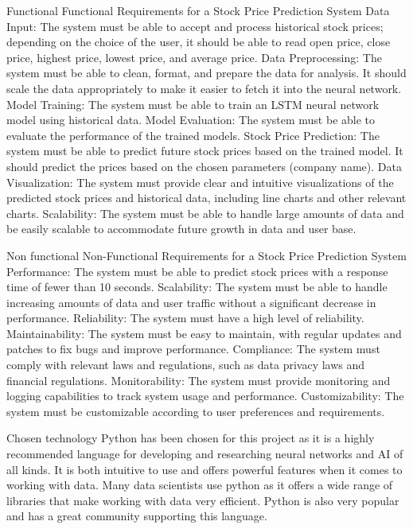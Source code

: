 \documentclass[a4paper,twoside,12pt]{book}
\begin{document}
\begin{itemize}

	Functional
	Functional Requirements for a Stock Price Prediction System
	Data Input: The system must be able to accept and process historical stock prices; depending on the choice of the user, it should be able to read open price, close price, highest price, lowest price, and average price.
	Data Preprocessing: The system must be able to clean, format, and prepare the data for analysis. It should scale the data appropriately to make it easier to fetch it into the neural network.
	Model Training: The system must be able to train an LSTM neural network model using historical data.
	Model Evaluation: The system must be able to evaluate the performance of the trained models.
	Stock Price Prediction: The system must be able to predict future stock prices based on the trained model. It should predict the prices based on the chosen parameters (company name).
	Data Visualization: The system must provide clear and intuitive visualizations of the predicted stock prices and historical data, including line charts and other relevant charts.
	Scalability: The system must be able to handle large amounts of data and be easily scalable to accommodate future growth in data and user base.
	
	
	Non functional
	Non-Functional Requirements for a Stock Price Prediction System
	Performance: The system must be able to predict stock prices with a response time of fewer than 10 seconds.
	Scalability: The system must be able to handle increasing amounts of data and user traffic without a significant decrease in performance.
	Reliability: The system must have a high level of reliability.
	Maintainability: The system must be easy to maintain, with regular updates and patches to fix bugs and improve performance.
	Compliance: The system must comply with relevant laws and regulations, such as data privacy laws and financial regulations.
	Monitorability: The system must provide monitoring and logging capabilities to track system usage and performance.
	Customizability: The system must be customizable according to user preferences and requirements.
	
	
	Chosen technology
	Python has been chosen for this project as it is a highly recommended language for developing and researching neural networks and AI of all kinds. It is both intuitive to use and offers powerful features when it comes to working with data. Many data scientists use python as it offers a wide range of libraries that make working with data very efficient. Python is also very popular and has a great community supporting this language.
	

\end{itemize}
\end{document}
